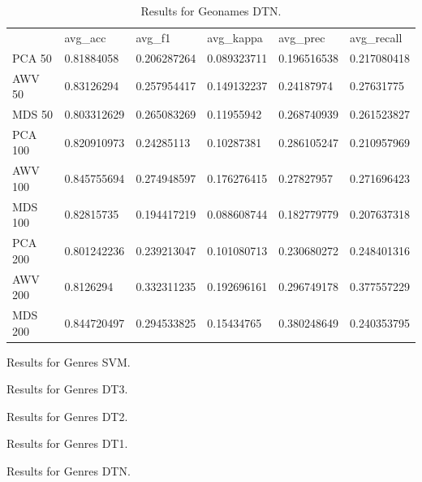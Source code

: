 \begin{table}[]
\begin{tabular}{llllll}
	& avg\_acc    & avg\_f1     & avg\_kappa  & avg\_prec   & avg\_recall \\
	PCA 50  & 0.81884058  & 0.206287264 & 0.089323711 & 0.196516538 & 0.217080418 \\
	AWV 50  & 0.83126294  & 0.257954417 & 0.149132237 & 0.24187974  & 0.27631775  \\
	MDS 50  & 0.803312629 & 0.265083269 & 0.11955942  & 0.268740939 & 0.261523827 \\
	PCA 100 & 0.820910973 & 0.24285113  & 0.10287381  & 0.286105247 & 0.210957969 \\
	AWV 100 & 0.845755694 & 0.274948597 & 0.176276415 & 0.27827957  & 0.271696423 \\
	MDS 100 & 0.82815735  & 0.194417219 & 0.088608744 & 0.182779779 & 0.207637318 \\
	PCA 200 & 0.801242236 & 0.239213047 & 0.101080713 & 0.230680272 & 0.248401316 \\
	AWV 200 & 0.8126294   & 0.332311235 & 0.192696161 & 0.296749178 & 0.377557229 \\
	MDS 200 & 0.844720497 & 0.294533825 & 0.15434765  & 0.380248649 & 0.240353795
\end{tabular}
\caption{Results for Geonames DTN.}
\label{table:Newsgroups}
\end{table}

\begin{table}[]
	
	\caption{Results for Genres SVM.}
	\label{table:Newsgroups}
\end{table}

\begin{table}[]

\caption{Results for Genres DT3.}
\label{table:Newsgroups}
\end{table}

\begin{table}[]

\caption{Results for Genres DT2.}
\label{table:Newsgroups}
\end{table}

\begin{table}[]

\caption{Results for Genres DT1.}
\label{table:Newsgroups}
\end{table}

\begin{table}[]

\caption{Results for Genres DTN.}
\label{table:Newsgroups}
\end{table}


